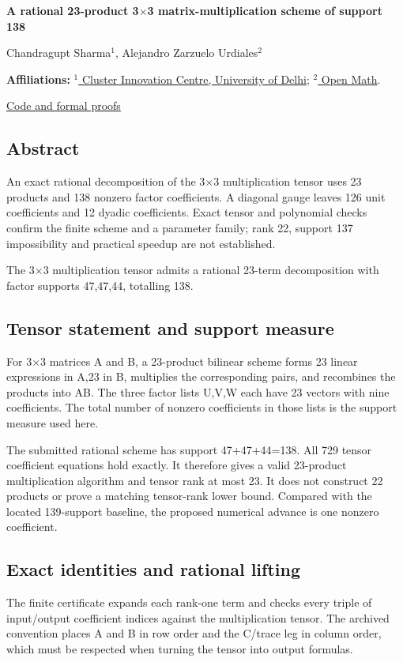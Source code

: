 \documentclass[11pt,a4paper]{article}
\begin{document}
{\LARGE\bfseries A rational 23-product 3\ensuremath{\times}3 matrix-multiplication scheme of support 138\par}\medskip
{\small Chandragupt Sharma\ensuremath{^1}, Alejandro Zarzuelo Urdiales\ensuremath{^2}\par}\medskip
{\small\textbf{Affiliations:} \href{https://www.du.ac.in/index.php?page=cluster-innovation-centre-cic}{\ensuremath{^1} Cluster Innovation Centre, University of Delhi}; \href{https://rsihouse.ai/openmath}{\ensuremath{^2} Open Math}.\par}

{\small\href{https://github.com/alejandrozu/openmath-2026-judging}{Code and formal proofs}\par}

\subsection{Abstract}
An exact rational decomposition of the 3\ensuremath{\times}3 multiplication tensor uses 23 products and 138 nonzero factor coefficients. A diagonal gauge leaves 126 unit coefficients and 12 dyadic coefficients. Exact tensor and polynomial checks confirm the finite scheme and a parameter family; rank 22, support 137 impossibility and practical speedup are not established.

The 3\ensuremath{\times}3 multiplication tensor admits a rational 23-term decomposition with factor supports 47,47,44, totalling 138.

\subsection{Tensor statement and support measure}
For 3\ensuremath{\times}3 matrices A and B, a 23-product bilinear scheme forms 23 linear expressions in A,23 in B, multiplies the corresponding pairs, and recombines the products into AB. The three factor lists U,V,W each have 23 vectors with nine coefficients. The total number of nonzero coefficients in those lists is the support measure used here.

The submitted rational scheme has support 47+47+44=138. All 729 tensor coefficient equations hold exactly. It therefore gives a valid 23-product multiplication algorithm and tensor rank at most 23. It does not construct 22 products or prove a matching tensor-rank lower bound. Compared with the located 139-support baseline, the proposed numerical advance is one nonzero coefficient.

\subsection{Exact identities and rational lifting}
The finite certificate expands each rank-one term and checks every triple of input/output coefficient indices against the multiplication tensor. The archived convention places A and B in row order and the C/trace leg in column order, which must be respected when turning the tensor into output formulas.
\end{document}
